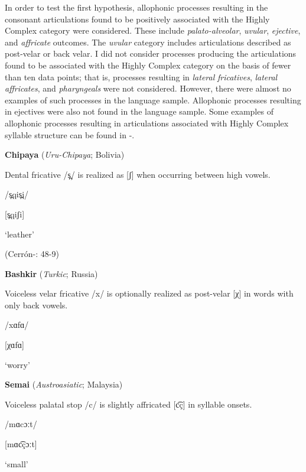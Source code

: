   In order to test the first hypothesis, allophonic processes resulting in the consonant articulations found to be positively associated with the Highly Complex category were considered. These include \textit{palato-alveolar}, \textit{uvular}, \textit{ejective}, and \textit{affricate} outcomes. The \textit{uvular} category includes articulations described as post-velar or back velar. I did not consider processes producing the articulations found to be associated with the Highly Complex category on the basis of fewer than ten data points; that is, processes resulting in \textit{lateral} \textit{fricatives}, \textit{lateral} \textit{affricates}, and \textit{pharyngeals} were not considered. However, there were almost no examples of such processes in the language sample. Allophonic processes resulting in ejectives were also not found in the language sample. Some examples of allophonic processes resulting in articulations associated with Highly Complex syllable structure can be found in -.

\ea\label{ex:(7.3)}
  \textbf{Chipaya} (\textit{Uru-Chipaya}; Bolivia)

Dental fricative /s̪/ is realized as [ʃ] when occurring between high vowels.

/s̪qis̪i/

[s̪qiʃi]

\glt ‘leather’

(Cerrón-\citealt{Palomino2006}: 48-9)

\z

\ea\label{ex:(7.4)}
  \textbf{Bashkir} (\textit{Turkic}; Russia)

Voiceless velar fricative /x/ is optionally realized as post-velar [χ] in words with only back vowels.

/xɑfɑ/

[χɑfɑ]

\glt ‘worry’

\citep[11]{Poppe1964}

\z

\ea\label{ex:(7.5)}
  \textbf{Semai} (\textit{Austroasiatic}; Malaysia)

Voiceless palatal stop /c/ is slightly affricated [c͡ç] in syllable onsets.

/mɑcɔːt/

[mɑc͡çɔːt]

\glt ‘small’

\citep[5]{Philips2007}
\z

